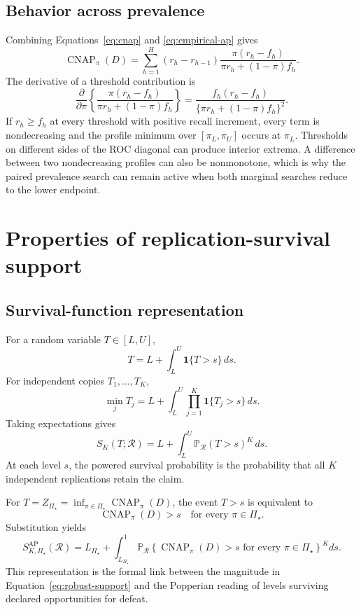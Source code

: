 \documentclass[11pt]{article}
\newcommand{\CNAP}{\operatorname{CNAP}}
\newcommand{\Regime}{\mathcal{R}}
\newcommand{\PSet}{\Pi_\star}
\newcommand{\Prb}{\mathbb{P}}
\newcommand{\SRob}{S_{K,\PSet}^{\mathrm{AP}}(\Regime)}
\theoremstyle{remark}
\begin{document}
\subsection{Behavior across prevalence}

Combining Equations~\eqref{eq:cnap} and \eqref{eq:empirical-ap} gives
\begin{equation}
\CNAP_\pi(D)
=
\sum_{h=1}^{H}
(r_h-r_{h-1})
\frac{\pi(r_h-f_h)}
{\pi r_h+(1-\pi)f_h}.
\label{eq:cnap-profile}
\end{equation}
The derivative of a threshold contribution is
\begin{equation}
\frac{\partial}{\partial\pi}
\left\{
\frac{\pi(r_h-f_h)}
{\pi r_h+(1-\pi)f_h}
\right\}
=
\frac{f_h(r_h-f_h)}
{\{\pi r_h+(1-\pi)f_h\}^2}.
\label{eq:cnap-derivative}
\end{equation}
If $r_h\geq f_h$ at every threshold with positive recall increment, every term is nondecreasing and the profile minimum over $[\pi_L,\pi_U]$ occurs at $\pi_L$. Thresholds on different sides of the ROC diagonal can produce interior extrema. A difference between two nondecreasing profiles can also be nonmonotone, which is why the paired prevalence search can remain active when both marginal searches reduce to the lower endpoint.

\section{Properties of replication-survival support}
\label{app:support-proofs}

\subsection{Survival-function representation}

For a random variable $T\in[L,U]$,
\[
T
=
L+\int_L^U\mathbf 1\{T>s\}\,ds.
\]
For independent copies $T_1,\ldots,T_K$,
\[
\min_jT_j
=
L+\int_L^U
\prod_{j=1}^{K}\mathbf 1\{T_j>s\}\,ds.
\]
Taking expectations gives
\begin{equation}
S_K(T;\Regime)
=
L+\int_L^U
\Prb_{\Regime}(T>s)^K\,ds.
\label{eq:survival-representation}
\end{equation}
At each level $s$, the powered survival probability is the probability that all $K$ independent replications retain the claim.

For $T=Z_{\PSet}=\inf_{\pi\in\PSet}\CNAP_\pi(D)$, the event $T>s$ is equivalent to
\[
\CNAP_\pi(D)>s
\quad\text{for every }\pi\in\PSet.
\]
Substitution yields
\begin{equation}
\SRob
=
L_{\PSet}
+
\int_{L_{\PSet}}^1
\Prb_{\Regime}
\left\{
\CNAP_\pi(D)>s
\text{ for every }\pi\in\PSet
\right\}^{K}
ds.
\label{eq:joint-survival}
\end{equation}
This representation is the formal link between the magnitude in Equation~\eqref{eq:robust-support} and the Popperian reading of levels surviving declared opportunities for defeat.
\end{document}
